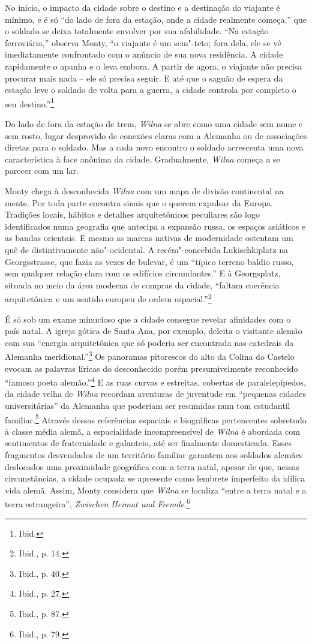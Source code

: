 No início, o impacto da cidade sobre o destino e a destinação do
viajante é mínimo, e é só ``do lado de fora da estação, onde a cidade
realmente começa,'' que o soldado se deixa totalmente envolver por sua
afabilidade. ``Na estação ferroviária,'' observa Monty, ``o viajante é
um sem"-teto; fora dela, ele se vê imediatamente confrontado com o
anúncio de sua nova residência. A cidade rapidamente o apanha e o leva
embora. A partir de agora, o viajante não precisa procurar mais nada --
ele só precisa seguir. E até que o saguão de espera da estação leve o
soldado de volta para a guerra, a cidade controla por completo o seu
destino.''\footnote{Ibid.}

Do lado de fora da estação de trem, \textit{Wilna} se abre como uma cidade sem
nome e sem rosto, lugar desprovido de conexões claras com a Alemanha ou
de associações diretas para o soldado. Mas a cada novo encontro o
soldado acrescenta uma nova característica à face anônima da cidade.
Gradualmente, \textit{Wilna} começa a se parecer com um lar.

Monty chega à desconhecida \textit{Wilna} com um mapa de divisão continental na
mente. Por toda parte encontra sinais que o querem expulsar da Europa.
Tradições locais, hábitos e detalhes arquitetônicos peculiares são logo
identificados numa geografia que antecipa a expansão russa, os espaços
asiáticos e as bandas orientais. E mesmo as marcas nativas de
modernidade ostentam um quê de distintivamente não"-ocidental. A
recém"-concebida Lukischkiplatz na Georgsstrasse, que fazia as vezes de
bulevar, é um ``típico terreno baldio russo, sem qualquer relação clara
com os edifícios circundantes.'' E à Georgsplatz, situada no meio da
área moderna de compras da cidade, ``faltam coerência arquitetônica e um
sentido europeu de ordem espacial.''\footnote{Ibid., p. 14.}

É só sob um exame minucioso que a cidade consegue revelar afinidades com
o país natal. A igreja gótica de Santa Ana, por exemplo, deleita o
visitante alemão com sua ``energia arquitetônica que só poderia ser
encontrada nas catedrais da Alemanha meridional.''\footnote{Ibid., p. 40.} Os panoramas pitorescos do alto da Colina do Castelo evocam as palavras líricas do desconhecido porém presumivelmente reconhecido
``famoso poeta alemão.''\footnote{Ibid., p. 27.} E as ruas curvas e
estreitas, cobertas de paralelepípedos, da cidade velha de \textit{Wilna}
recordam aventuras de juventude em ``pequenas cidades universitárias''
da Alemanha que poderiam ser resumidas num tom estudantil
familiar.\footnote{Ibid., p. 87.} Através dessas referências espaciais e
biográficas pertencentes sobretudo à classe média alemã, a espacialidade
incompreensível de \textit{Wilna} é abordada com sentimentos de fraternidade e
galanteio, até ser finalmente domesticada. Esses fragmentos desvendados
de um território familiar garantem aos soldados alemães deslocados uma
proximidade geográfica com a terra natal, apesar de que, nessas
circunstâncias, a cidade ocupada se apresente como lembrete imperfeito
da idílica vida alemã. Assim, Monty considera que \textit{Wilna} se localiza
``entre a terra natal e a terra estrangeira'', \textit{Zwischen Heimat
und Fremde}.\footnote{Ibid., p. 79.}

